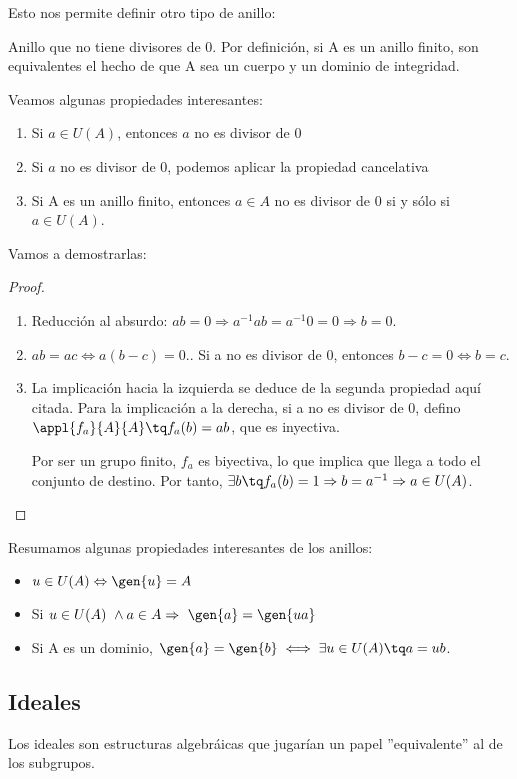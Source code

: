 \documentclass[nochap]{apuntes}
\begin{document}
Esto nos permite definir otro tipo de anillo:
\begin{defn}
 Anillo que no tiene divisores de 0. Por definición, si A es un anillo finito, son equivalentes el hecho de que A sea un cuerpo y un dominio de integridad.
\end{defn}

Veamos algunas propiedades interesantes:
\begin{enumerate}
 \item Si $a \in U(A)$, entonces $a$ no es divisor de 0
 \item Si $a$ no es divisor de 0, podemos aplicar la propiedad cancelativa
 \item Si A es un anillo finito, entonces  $a \in A$ no es divisor de 0 si y sólo si  $a \in U(A)$.
\end{enumerate}

Vamos a demostrarlas:
\begin{proof}
 \begin{enumerate}
  \item Reducción al absurdo: $ab=0 \Rightarrow a^{-1}ab=a^{-1}0=0 \Rightarrow b=0$.
  \item $ab=ac \Leftrightarrow a(b-c)=0$.. Si a no es divisor de 0, entonces $b-c=0 \Leftrightarrow b=c$.
  \item La implicación hacia la izquierda se deduce de la segunda propiedad aquí citada.
  Para la implicación a la derecha, si a no es divisor de 0, defino $\appl{f_a}{A}{A} \tq f_a(b)=ab$, que es inyectiva.

  Por ser un grupo finito, $f_a$ es biyectiva, lo que implica que llega a todo el conjunto de destino. Por tanto, $\exists b \tq f_a(b)=1 \Rightarrow b=a^{-1}  \Rightarrow a \in U(A)$.
 \end{enumerate}

\end{proof}

Resumamos algunas propiedades interesantes de los anillos:
\begin{itemize}
 \item $u\in U(A) \Leftrightarrow \gen{u} = A$
 \item Si $u \in U(A) \ \wedge a \in A \Rightarrow \ \gen{a}=\gen{ua}$
 \item Si A es un dominio, $\gen{a}=\gen{b} \iff \exists u \in U(A) \tq a=ub$.
\end{itemize}

\subsection{Ideales}
Los ideales son estructuras algebráicas que jugarían un papel ''equivalente'' al de los subgrupos.
\end{document}
